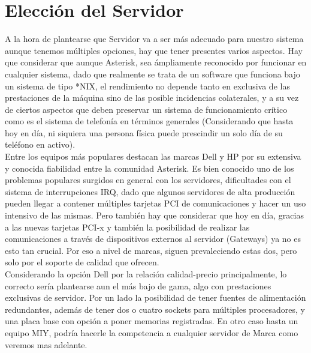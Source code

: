 
\section{Elección del Servidor}

A la hora de plantearse que Servidor va a ser más adecuado para nuestro sistema aunque tenemos múltiples opciones, hay que tener presentes varios aspectos. Hay que considerar que aunque Asterisk, sea ámpliamente reconocido por funcionar en cualquier sistema, dado que realmente se trata de un software que funciona bajo un sistema de tipo *NIX, el rendimiento no depende tanto en exclusiva de las prestaciones de la máquina sino de las posible incidencias colaterales, y a su vez de ciertos aspectos que deben preservar un sistema de funcionamiento crítico como es el sistema de telefonía en términos generales (Considerando que hasta hoy en día, ni siquiera una persona física puede prescindir un solo día de su teléfono en activo).\\

Entre los equipos más populares destacan las marcas Dell y HP por su extensiva y conocida fiabilidad entre la comunidad Asterisk. Es bien conocido uno de los problemas populares surgidos en general con los servidores, dificultades con el sistema de interrupciones IRQ, dado que algunos servidores de alta producción pueden llegar a contener múltiples tarjetas PCI de comunicaciones  y hacer un uso intensivo de las mismas. Pero también hay que considerar que hoy en día, gracias a las nuevas tarjetas PCI-x y también la posibilidad de realizar las comunicaciones a través de dispositivos externos al servidor (Gateways) ya no es esto tan crucial. Por eso a nivel de marcas, siguen prevaleciendo estas dos, pero solo por el soporte de calidad que ofrecen. \\

Considerando la opción Dell por la relación calidad-precio principalmente, lo  correcto sería plantearse aun el más bajo de gama, algo con prestaciones exclusivas de servidor. Por un lado la posibilidad de tener fuentes de alimentación redundantes, además de tener dos o cuatro sockets para múltiples procesadores, y una placa base con opción a poner memorias registradas. En otro caso hasta un equipo MIY, podría hacerle la competencia a cualquier servidor de Marca como veremos mas adelante.\\

